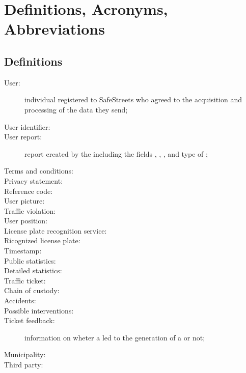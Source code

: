\documentclass[../../rasd.tex]{subfiles}
\begin{document}
\section{Definitions, Acronyms, Abbreviations\label{sect:1.3}}

\subsection{Definitions\label{sect:1.3.1}}
\begin{description}
	\item[User:] individual registered to SafeStreets who agreed to the acquisition and processing of the data they send;
	\item[User identifier:]
	\item[User report:] report created by the  including the fields , , ,  and type of ;
	\item[Terms and conditions:]
	\item[Privacy statement:]
	\item[Reference code:]
	\item[User picture:]
	\item[Traffic violation:]
	\item[User position:]
	\item[License plate recognition service:]
	\item[Ricognized license plate:]
	\item[Timestamp:]
	\item[Public statistics:]
	\item[Detailed statistics:]
	\item[Traffic ticket:]
	\item[Chain of custody:]
	\item[Accidents:]
	\item[Possible interventions:]
	\item[Ticket feedback:] information on wheter a  led to the generation of a  or not;
	\item[Municipality:]
	\item[Third party:]
\end{description}
\end{document}
